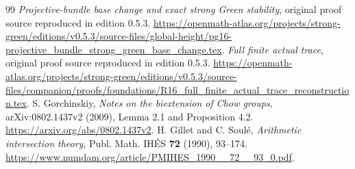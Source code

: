\documentclass[11pt,a4paper]{article}
\theoremstyle{definition}
\numberwithin{equation}{section}
\begin{document}
\begin{thebibliography}{99}
 \emph{Projective-bundle base change and exact strong Green stability}, original proof source reproduced in edition 0.5.3. \url{https://openmath-atlas.org/projects/strong-green/editions/v0.5.3/source-files/global-height/pg16-projective_bundle_strong_green_base_change.tex}.
 \emph{Full finite actual trace}, original proof source reproduced in edition 0.5.3. \url{https://openmath-atlas.org/projects/strong-green/editions/v0.5.3/source-files/companion/proofs/foundations/R16_full_finite_actual_trace_reconstruction.tex}.
 S. Gorchinskiy, \emph{Notes on the biextension of Chow groups}, arXiv:0802.1437v2 (2009), Lemma 2.1 and Proposition 4.2. \url{https://arxiv.org/abs/0802.1437v2}.
 H. Gillet and C. Soul\'e, \emph{Arithmetic intersection theory}, Publ. Math. IH\'ES \textbf{72} (1990), 93--174. \url{https://www.numdam.org/article/PMIHES_1990__72__93_0.pdf}.
\end{thebibliography}
\end{document}
